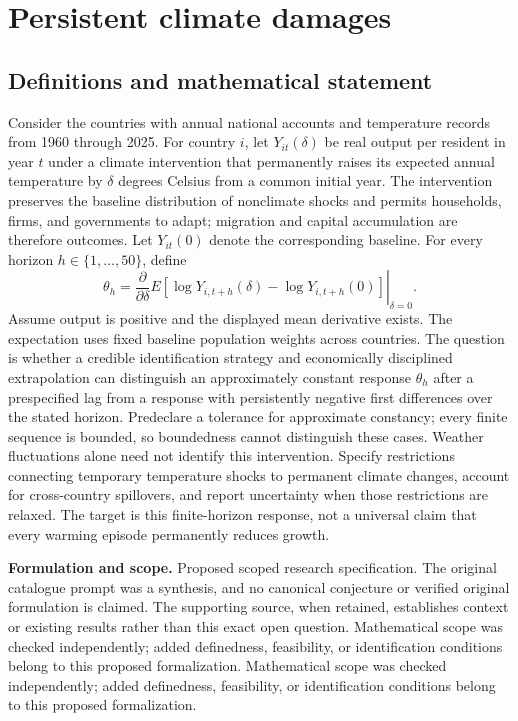 \documentclass[11pt]{article}
\begin{document}
\section*{Persistent climate damages}\label{30007712}
\subsection{Definitions and mathematical statement}
Consider the countries with annual national accounts and temperature records from 1960 through 2025. For country \(i\), let \(Y_{it}(\delta)\) be real output per resident in year \(t\) under a climate intervention that permanently raises its expected annual temperature by \(\delta\) degrees Celsius from a common initial year. The intervention preserves the baseline distribution of nonclimate shocks and permits households, firms, and governments to adapt; migration and capital accumulation are therefore outcomes. Let \(Y_{it}(0)\) denote the corresponding baseline. For every horizon \(h\in\{1,\ldots,50\}\), define
\[\theta_h=\left.\frac{\partial}{\partial\delta}E[\log Y_{i,t+h}(\delta)-\log Y_{i,t+h}(0)]\right|_{\delta=0}.\]
Assume output is positive and the displayed mean derivative exists. The expectation uses fixed baseline population weights across countries. The question is whether a credible identification strategy and economically disciplined extrapolation can distinguish an approximately constant response \(\theta_h\) after a prespecified lag from a response with persistently negative first differences over the stated horizon. Predeclare a tolerance for approximate constancy; every finite sequence is bounded, so boundedness cannot distinguish these cases. Weather fluctuations alone need not identify this intervention. Specify restrictions connecting temporary temperature shocks to permanent climate changes, account for cross-country spillovers, and report uncertainty when those restrictions are relaxed. The target is this finite-horizon response, not a universal claim that every warming episode permanently reduces growth.

\par\textbf{Formulation and scope.} Proposed scoped research specification. The original catalogue prompt was a synthesis, and no canonical conjecture or verified original formulation is claimed. The supporting source, when retained, establishes context or existing results rather than this exact open question. Mathematical scope was checked independently; added definedness, feasibility, or identification conditions belong to this proposed formalization. Mathematical scope was checked independently; added definedness, feasibility, or identification conditions belong to this proposed formalization.
\end{document}
